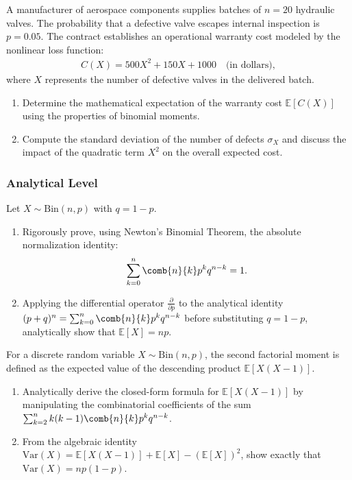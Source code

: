 \begin{problema}
	\label{prob:3.4.6}
	A manufacturer of aerospace components supplies batches of $n = 20$ hydraulic valves. The probability that a defective valve escapes internal inspection is $p = 0.05$. The contract establishes an operational warranty cost modeled by the nonlinear loss function:
	\begin{align*}
		C(X) = 500 X^2 + 150 X + 1000 \quad \text{(in dollars)},
	\end{align*}
	where $X$ represents the number of defective valves in the delivered batch.
	\begin{enumerate}
		\item Determine the mathematical expectation of the warranty cost $\mathbb{E}[C(X)]$ using the properties of binomial moments.
		\item Compute the standard deviation of the number of defects $\sigma_X$ and discuss the impact of the quadratic term $X^2$ on the overall expected cost.
	\end{enumerate}
\end{problema}

\subsubsection*{Analytical Level}

\begin{problema}
	\label{prob:3.4.7}
	Let $X \sim \text{Bin}(n, p)$ with $q = 1-p$.
	\begin{enumerate}
		\item Rigorously prove, using Newton's Binomial Theorem, the absolute normalization identity:
		\begin{align*}
			\sum_{k=0}^n \comb{n}{k} p^k q^{n-k} = 1.
		\end{align*}
		\item Applying the differential operator $\frac{\partial}{\partial p}$ to the analytical identity $(p+q)^n = \sum_{k=0}^n \comb{n}{k} p^k q^{n-k}$ before substituting $q=1-p$, analytically show that $\mathbb{E}[X] = np$.
	\end{enumerate}
\end{problema}

\begin{problema}
	\label{prob:3.4.8}
	For a discrete random variable $X \sim \text{Bin}(n, p)$, the second factorial moment is defined as the expected value of the descending product $\mathbb{E}[X(X-1)]$.
	\begin{enumerate}
		\item Analytically derive the closed-form formula for $\mathbb{E}[X(X-1)]$ by manipulating the combinatorial coefficients of the sum $\sum_{k=2}^n k(k-1)\comb{n}{k} p^k q^{n-k}$.
		\item From the algebraic identity $\text{Var}(X) = \mathbb{E}[X(X-1)] + \mathbb{E}[X] - (\mathbb{E}[X])^2$, show exactly that $\text{Var}(X) = np(1-p)$.
	\end{enumerate}
\end{problema}

